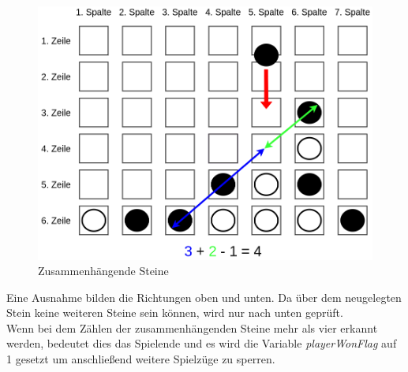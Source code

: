         \begin{figure}[H]
            \centering
            \includegraphics[scale=0.3]{img/gewinnbedingung.png}    
            \caption{Zusammenhängende Steine}
        \end{figure}

        Eine Ausnahme bilden die Richtungen oben und unten.
        Da über dem neugelegten Stein keine weiteren Steine sein können, wird nur nach unten geprüft.
        \\
        Wenn bei dem Zählen der zusammenhängenden Steine mehr als vier erkannt werden,
        bedeutet dies das Spielende und es wird die Variable \textit{playerWonFlag} auf 1 gesetzt um anschließend weitere Spielzüge zu sperren.

      